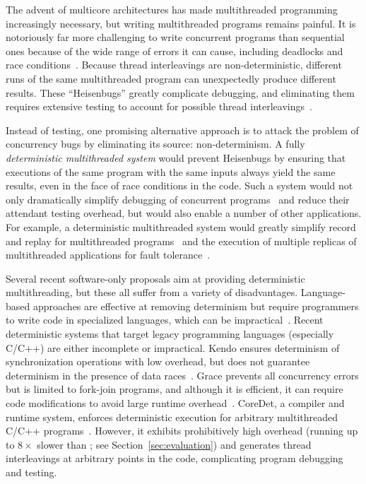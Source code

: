 
\label{sec:introduction}

The advent of multicore architectures has made multithreaded
programming increasingly necessary, but writing multithreaded programs remains painful. It is notoriously far more challenging to write concurrent programs than sequential ones because of the wide range of errors it can cause, including deadlocks and race conditions~\cite{havender,76897,130623}. Because thread interleavings are non-deterministic, different runs of the same multithreaded program can unexpectedly produce different results. These ``Heisenbugs'' greatly complicate debugging, and eliminating them requires extensive testing to account for possible thread interleavings~\cite{DBLP:conf/icse/BallBHMQ09,DBLP:conf/asplos/BurckhardtKMN10}.


Instead of testing, one promising alternative approach is to attack the problem of concurrency bugs by eliminating its source: non-determinism. A fully \emph{deterministic multithreaded system} would prevent Heisenbugs by ensuring that executions of the same program with the same inputs always yield the same results, even in the face of race conditions in the code. Such a system would not only dramatically simplify debugging of concurrent programs~\cite{Carver:1991:RTC:624586.625040} and reduce their attendant testing overhead, but would also enable a number of other applications. For example, a deterministic multithreaded system would greatly simplify record and replay for multithreaded programs~\cite{Choi:1998:DRJ:281035.281041,LeBlanc:1987:DPP:32387.32396}
and the execution of multiple replicas of multithreaded applications for fault tolerance~\cite{deterministic-process-groups,1134000,224058,replicant-hotos}.

Several recent software-only proposals aim at providing
deterministic multithreading, but these all suffer from a variety of disadvantages. Language-based approaches are effective at removing determinism but require programmers to write code in specialized languages, which can be impractical~\cite{Bocchino:2009:TES:1640089.1640097,Burckhardt:2010:CPR:1869459.1869515,Simpson:1999:SEE:330346.330357}. Recent deterministic systems that target legacy programming languages
(especially C/C++) are either incomplete or impractical. Kendo ensures determinism of synchronization operations with low overhead, but does not guarantee determinism in the presence of data races~\cite{1508256}. Grace prevents all concurrency errors but is limited to fork-join programs, and although it is efficient, it can require code modifications to avoid large runtime overhead~\cite{grace}. CoreDet, a compiler and runtime system, enforces deterministic execution for arbitrary multithreaded C/C++ programs~\cite{Bergan:2010:CCR:1736020.1736029}. However, it exhibits prohibitively high overhead (running up to $8\times$ slower than \pthreads{}; see Section~\ref{sec:evaluation}) and generates thread interleavings at arbitrary points in the code, complicating program debugging and testing.

